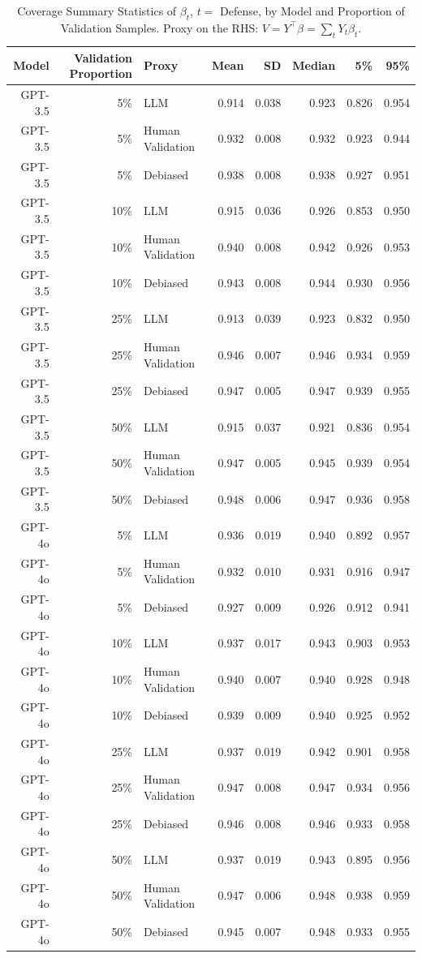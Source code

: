 \begin{table}

\caption{Coverage Summary Statistics of $\beta_{t}$, $t=$ Defense, by Model and Proportion of Validation Samples.
      Proxy on the RHS: $V = Y^\top \beta = \sum_{t} Y_t \beta_t$.}
\centering
\begin{tabular}[t]{rrlrrrrr}
\toprule
Model & Validation Proportion & Proxy & Mean & SD & Median & 5\% & 95\%\\
\midrule
GPT-3.5 & 5\% & LLM & 0.914 & 0.038 & 0.923 & 0.826 & 0.954\\
GPT-3.5 & 5\% & Human Validation & 0.932 & 0.008 & 0.932 & 0.923 & 0.944\\
GPT-3.5 & 5\% & Debiased & 0.938 & 0.008 & 0.938 & 0.927 & 0.951\\
GPT-3.5 & 10\% & LLM & 0.915 & 0.036 & 0.926 & 0.853 & 0.950\\
GPT-3.5 & 10\% & Human Validation & 0.940 & 0.008 & 0.942 & 0.926 & 0.953\\
GPT-3.5 & 10\% & Debiased & 0.943 & 0.008 & 0.944 & 0.930 & 0.956\\
GPT-3.5 & 25\% & LLM & 0.913 & 0.039 & 0.923 & 0.832 & 0.950\\
GPT-3.5 & 25\% & Human Validation & 0.946 & 0.007 & 0.946 & 0.934 & 0.959\\
GPT-3.5 & 25\% & Debiased & 0.947 & 0.005 & 0.947 & 0.939 & 0.955\\
GPT-3.5 & 50\% & LLM & 0.915 & 0.037 & 0.921 & 0.836 & 0.954\\
GPT-3.5 & 50\% & Human Validation & 0.947 & 0.005 & 0.945 & 0.939 & 0.954\\
GPT-3.5 & 50\% & Debiased & 0.948 & 0.006 & 0.947 & 0.936 & 0.958\\
GPT-4o & 5\% & LLM & 0.936 & 0.019 & 0.940 & 0.892 & 0.957\\
GPT-4o & 5\% & Human Validation & 0.932 & 0.010 & 0.931 & 0.916 & 0.947\\
GPT-4o & 5\% & Debiased & 0.927 & 0.009 & 0.926 & 0.912 & 0.941\\
GPT-4o & 10\% & LLM & 0.937 & 0.017 & 0.943 & 0.903 & 0.953\\
GPT-4o & 10\% & Human Validation & 0.940 & 0.007 & 0.940 & 0.928 & 0.948\\
GPT-4o & 10\% & Debiased & 0.939 & 0.009 & 0.940 & 0.925 & 0.952\\
GPT-4o & 25\% & LLM & 0.937 & 0.019 & 0.942 & 0.901 & 0.958\\
GPT-4o & 25\% & Human Validation & 0.947 & 0.008 & 0.947 & 0.934 & 0.956\\
GPT-4o & 25\% & Debiased & 0.946 & 0.008 & 0.946 & 0.933 & 0.958\\
GPT-4o & 50\% & LLM & 0.937 & 0.019 & 0.943 & 0.895 & 0.956\\
GPT-4o & 50\% & Human Validation & 0.947 & 0.006 & 0.948 & 0.938 & 0.959\\
GPT-4o & 50\% & Debiased & 0.945 & 0.007 & 0.948 & 0.933 & 0.955\\
\bottomrule
\end{tabular}
\end{table}
